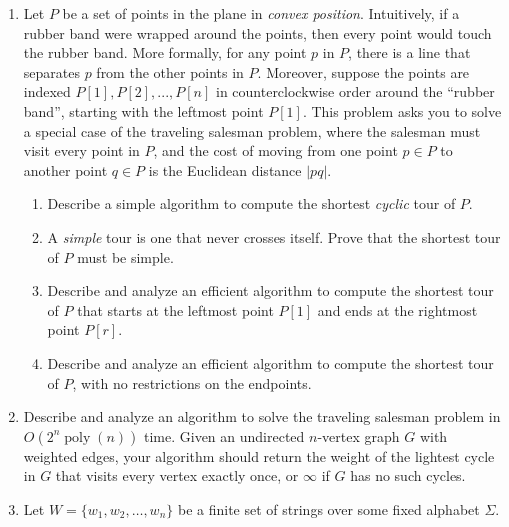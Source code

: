 \begin{enumerate}[label=\arabic*.,ref=\thechapter.\arabic*,leftmargin=*,align=left,widest*=99,itemsep=1.5ex plus 0.5ex]
\begin{enumerate}
\item For full credit, describe an algorithm that runs in $O(n^5)$ time.
\item {} For extra credit, describe an algorithm that runs in $O(n^4)$ time.
\item {} For extra extra credit, describe an algorithm that runs in $O(n^3 \operatorname{polylog} n)$ time.
\end{enumerate}
\item Let $P$ be a set of points in the plane in \textit{convex position}.
Intuitively, if a rubber band were wrapped around the points, then every point would touch the rubber band.
More formally, for any point $p$ in $P$, there is a line that separates $p$ from the other points in $P$.
Moreover, suppose the points are indexed $P[1],P[2],...,P[n]$ in counterclockwise order around the “rubber band”, starting with the leftmost point $P[1]$.
This problem asks you to solve a special case of the traveling salesman problem, where the salesman must visit every point in $P$, and the cost of moving from one point $p\in P$ to another point $q\in P$ is the Euclidean distance $|pq|$.
\begin{enumerate}
\item Describe a simple algorithm to compute the shortest \textit{cyclic} tour of $P$.
\item A \textit{simple} tour is one that never crosses itself.
Prove that the shortest tour of $P$ must be simple.
\item Describe and analyze an efficient algorithm to compute the shortest tour of $P$ that starts at the leftmost point $P[1]$ and ends at the rightmost point $P[r]$.
\item Describe and analyze an efficient algorithm to compute the shortest tour of $P$, with no restrictions on the endpoints.
\end{enumerate}
\item {} Describe and analyze an algorithm to solve the traveling salesman problem in $O(2^n \operatorname{poly}(n))$ time.
Given an undirected $n$-vertex graph $G$ with weighted edges, your algorithm should return the weight of the lightest cycle in $G$ that visits every vertex exactly once, or $\infty$ if $G$ has no such cycles.
\item Let $W=\{w_1,w_2,\ldots,w_n\}$ be a finite set of strings over some fixed alphabet $\Sigma$.

\end{enumerate}
